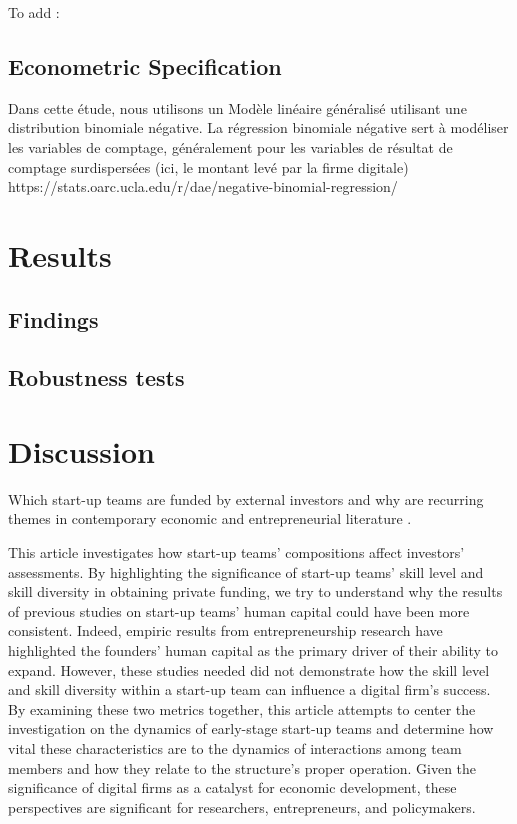 \documentclass[12pt]{article}
\begin{document}
To add : \citet{ratzinger2018impact}

\subsection{Econometric Specification}

Dans cette étude, nous utilisons un Modèle linéaire généralisé utilisant une distribution binomiale négative. La régression binomiale négative sert à modéliser les variables de comptage, généralement pour les variables de résultat de comptage surdispersées (ici, le montant levé par la firme digitale) https://stats.oarc.ucla.edu/r/dae/negative-binomial-regression/

\section{Results}

\subsection{Findings}


\subsection{Robustness tests}


\section{Discussion}

Which start-up teams are funded by external investors and why are recurring themes in contemporary economic and entrepreneurial literature \citep{baum2004picking, beckman2007early, bernstein2017attracting, franke2006you, franke2008venture, plummer2016better, kaplan2009should, shane2002network}.

This article investigates how start-up teams' compositions affect investors' assessments. By highlighting the significance of start-up teams' skill level and skill diversity in obtaining private funding, we try to understand why the results of previous studies on start-up teams' human capital could have been more consistent. Indeed, empiric results from entrepreneurship research have highlighted the founders' human capital as the primary driver of their ability to expand. However, these studies needed did not demonstrate how the skill level and skill diversity within a start-up team can influence a digital firm's success. By examining these two metrics together, this article attempts to center the investigation on the dynamics of early-stage start-up teams and determine how vital these characteristics are to the dynamics of interactions among team members and how they relate to the structure's proper operation. Given the significance of digital firms as a catalyst for economic development, these perspectives are significant for researchers, entrepreneurs, and policymakers.
\end{document}
